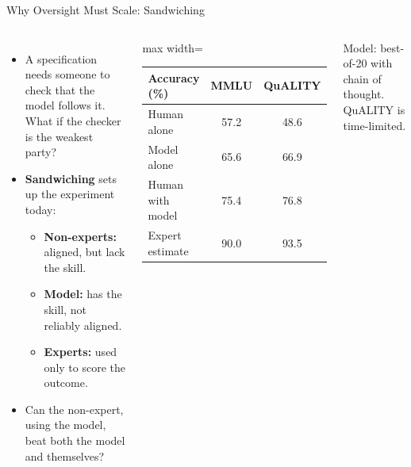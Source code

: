 \begin{frame}{Why Oversight Must Scale: Sandwiching}
    \begin{columns}[T,onlytextwidth]
        \begin{itemize}\itemsep0.5em
            \item A specification needs someone to check that the model follows it. What if the checker is the weakest party?
            \item \textbf{Sandwiching} sets up the experiment today:
            \begin{itemize}\itemsep0.25em
                \item \textbf{Non-experts:} aligned, but lack the skill.
                \item \textbf{Model:} has the skill, not reliably aligned.
                \item \textbf{Experts:} used only to score the outcome.
            \end{itemize}
            \item Can the non-expert, using the model, beat both the model and themselves?
        \end{itemize}
        \centering
        \small
        \begin{adjustbox}{max width=\linewidth}\begin{tabular}{lcc}
            \toprule
            \textbf{Accuracy (\%)} & \textbf{MMLU} & \textbf{QuALITY} \\
            \midrule
            Human alone & 57.2 & 48.6 \\
            Model alone & 65.6 & 66.9 \\
            \rowcolor{KAUSTcyan!12} Human with model & 75.4 & 76.8 \\
            Expert estimate & 90.0 & 93.5 \\
            \bottomrule
        \end{tabular}\end{adjustbox}

        \vspace{0.6em}
        {\scriptsize Model: best-of-20 with chain of thought. QuALITY is time-limited.}
    \end{columns}
    \vspace{0.4em}
\end{frame}

